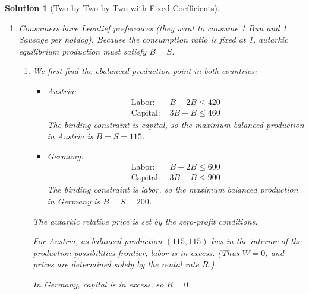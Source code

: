 \documentclass[a4paper,12pt]{article} %
\theoremstyle{nonitalic}
\newtheorem{solution}{Solution}
\begin{document}
\begin{solution}[Two-by-Two-by-Two with Fixed Coefficients]
\begin{enumerate}
        \item[3.] Consumers have Leontief preferences (they want to consume 1 Bun and 1 Sausage per hotdog). Because the consumption ratio is fixed at 1, autarkic equilibrium production must satisfy $B=S$.
            \begin{enumerate}
                \item[(a)] We first find the ebalanced production point in both countries:
                    \begin{itemize}
                        \item Austria: 
                            \begin{align*}
                                \text{Labor: } & B + 2B \leq 420 \\
                                \text{Capital: } & 3B + B \leq 460
                            \end{align*}
                            The binding constraint is capital, so the maximum balanced production in Austria is $B = S = 115$.
                        \item Germany:
                            \begin{align*}
                                \text{Labor: } & B + 2B \leq 600 \\
                                \text{Capital: } & 3B + B \leq 900
                            \end{align*}
                            The binding constraint is labor, so the maximum balanced production in Germany is $B = S = 200$.
                    \end{itemize}
                    The autarkic relative price is set by the zero-profit conditions.

                    For Austria, as balanced production $(115, 115)$ lies in the interior of the production possibilities frontier, labor is in excess. (Thus $W = 0$, and prices are determined solely by the rental rate $R$.)

                    In Germany, capital is in excess, so $R = 0$.


\end{enumerate}
\end{enumerate}
\end{solution}
\end{document}

